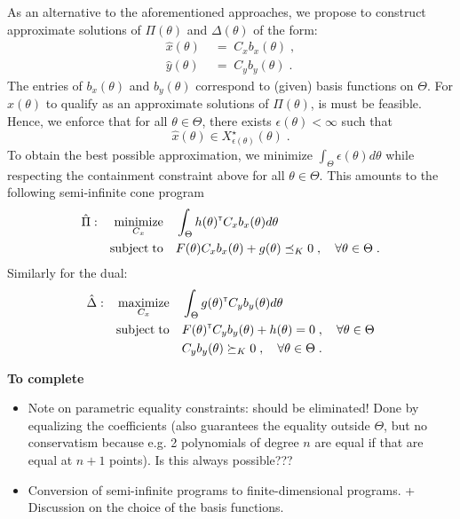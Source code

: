 \documentclass{article}
\renewcommand{\t}{^{\mbox{\tiny \sf T}}}
\DeclareMathOperator*{\minimize}{minimize}
\DeclareMathOperator*{\maximize}{maximize}
\DeclareMathOperator*{\subj}{subject\;to}
\begin{document}
As an alternative to the aforementioned approaches, we propose to construct approximate solutions of $\Pi(\theta)$ and $\Delta(\theta)$ of the form:
\begin{align}
\hat{x}(\theta) &\;=\; C_x b_x(\theta)\;,\\
\hat{y}(\theta) &\;=\; C_y b_y(\theta)\;.
\end{align}
The entries of $b_x(\theta)$ and $b_y(\theta)$ correspond to (given) basis functions on $\Theta$. For $\hat{x}(\theta)$ to qualify as an approximate  solutions of $\Pi(\theta)$, is must be feasible. Hence, we enforce that for all $\theta\in\Theta$, there exists $\epsilon(\theta)<\infty$ such that
\[ \hat{x}(\theta) \in X^\star_{\epsilon(\theta)}(\theta) \;.
\]
To obtain the best possible approximation, we minimize $\int_{\Theta}\epsilon(\theta)d\theta$ while respecting the containment constraint above for all $\theta\in\Theta$. This amounts to the following semi-infinite cone program
\begin{gather}\label{eq:semi-inf_primal}
\begin{aligned}
\hat{\Pi}: && \minimize_{C_x} &&& \int_{\Theta} h(\theta)\t  C_x b_x(\theta) d\theta\\%
           && \subj           &&& F(\theta) C_x b_x(\theta)+g(\theta)\preceq_K 0 \;, \quad\forall\theta\in\Theta\;.%
\end{aligned}
\end{gather}
Similarly for the dual:
\begin{gather}\label{eq:semi-inf_dual}
\begin{aligned}
\hat{\Delta}: && \maximize_{C_x} &&& \int_{\Theta} g(\theta)\t  C_y b_y(\theta) d\theta\\%
              && \subj           &&& F(\theta)\t  C_y b_y(\theta) + h(\theta)= 0 \;, \quad\forall\theta\in\Theta\\%
              &&                 &&&  C_y b_y(\theta)\succeq_K 0  \;, \quad\forall\theta\in\Theta\;.%
\end{aligned}
\end{gather}

\vspace*{12pt}\noindent
\textbf{To complete}
\begin{itemize}
\item Note on parametric equality constraints: should be eliminated! Done by equalizing the coefficients (also guarantees the equality outside $\Theta$, but no conservatism because e.g. 2 polynomials of degree $n$ are equal if that are equal at $n+1$ points). Is this always possible???
\item Conversion of semi-infinite programs to finite-dimensional programs. + Discussion on the choice of the basis functions.
\end{itemize}
\end{document}
